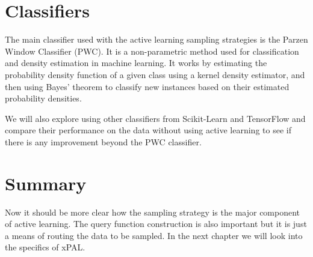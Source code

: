 \section{Classifiers}

The main classifier used with the active learning sampling strategies is the Parzen Window Classifier (PWC). It is a non-parametric method used for classification and density estimation in machine learning. It works by estimating the probability density function of a given class using a kernel density estimator, and then using Bayes' theorem to classify new instances based on their estimated probability densities.

We will also explore using other classifiers from Scikit-Learn and TensorFlow and compare their performance on the data without using active learning to see if there is any improvement beyond the PWC classifier.

\section{Summary}
Now it should be more clear how the sampling strategy is the major component of active learning. The query function construction is also important but it is just a means of routing the data to be sampled. In the next chapter we will look into the specifics of xPAL.
